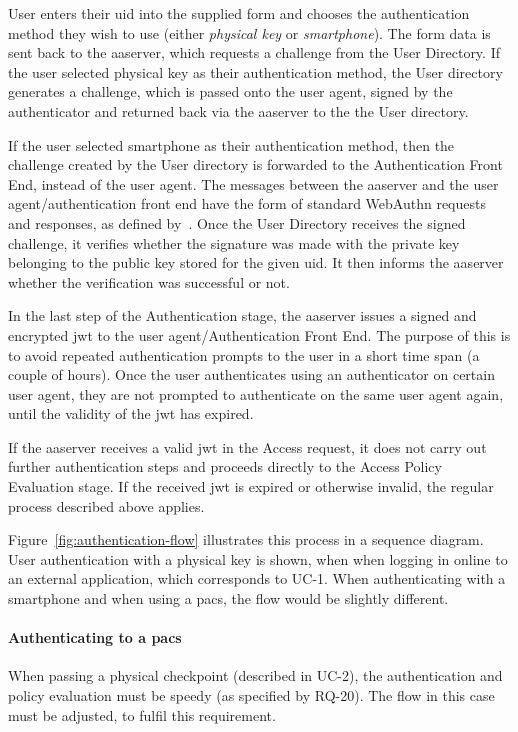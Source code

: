 User enters their \acrshort{uid} into the supplied form and chooses the authentication method they wish to use (either \textit{physical key} or \textit{smartphone}). The form data is sent back to the \acrshort{aaserver}, which requests a challenge from the User Directory. If the user selected physical key as their authentication method, the User directory generates a challenge, which is passed onto the user agent, signed by the authenticator and returned back via the \acrshort{aaserver} to the the User directory.

If the user selected smartphone as their authentication method, then the challenge created by the User directory is forwarded to the Authentication Front End, instead of the user agent. The messages between the \acrshort{aaserver} and the user agent/authentication front end have the form of standard WebAuthn requests and responses, as defined by~\cite{Balfanz2019Web1}. 
Once the User Directory receives the signed challenge, it verifies whether the signature was made with the private key belonging to the public key stored for the given \acrshort{uid}. It then informs the \acrshort{aaserver} whether the verification was successful or not.

In the last step of the Authentication stage, the \acrshort{aaserver} issues a signed and encrypted \acrshort{jwt} to the user agent/Authentication Front End. The purpose of this is to avoid repeated authentication prompts to the user in a short time span (a couple of hours). Once the user authenticates using an authenticator on certain user agent, they are not prompted to authenticate on the same user agent again, until the validity of the \acrshort{jwt} has expired.

If the \acrshort{aaserver} receives a valid \acrshort{jwt} in the Access request, it does not carry out further authentication steps and proceeds directly to the Access Policy Evaluation stage. If the received \acrshort{jwt} is expired or otherwise invalid, the regular process described above applies.

Figure~\ref{fig:authentication-flow} illustrates this process in a sequence diagram. User authentication with a physical key is shown, when when logging in online to an external application, which corresponds to UC-1. When authenticating with a smartphone and when using a \acrshort{pacs}, the flow would be slightly different.

\paragraph{Authenticating to a \acrshort{pacs}} 
When passing a physical checkpoint (described in UC-2), the authentication and policy evaluation must be speedy (as specified by RQ-20). The flow in this case must be adjusted, to fulfil this requirement.

